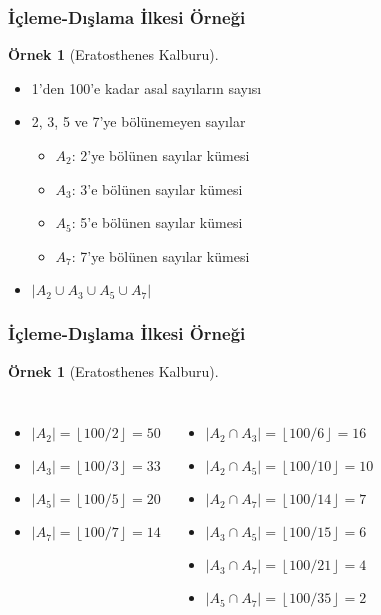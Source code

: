 \documentclass[dvipsnames]{beamer}
\theoremstyle{definition}
\theoremstyle{example}
\newtheorem{ornek}[theorem]{Örnek}
\theoremstyle{plain}
\begin{document}
\begin{frame}
  \frametitle{İçleme-Dışlama İlkesi Örneği}

  \begin{ornek}[Eratosthenes Kalburu]
    \begin{itemize}
      \item 1'den 100'e kadar asal sayıların sayısı
      \medskip

      \pause
      \item 2, 3, 5 ve 7'ye bölünemeyen sayılar
      \begin{itemize}
        \item $A_2$: 2'ye bölünen sayılar kümesi
        \item $A_3$: 3'e bölünen sayılar kümesi
        \item $A_5$: 5'e bölünen sayılar kümesi
        \item $A_7$: 7'ye bölünen sayılar kümesi
      \end{itemize}

      \pause
      \item $|A_2 \cup A_3 \cup A_5 \cup A_7|$
    \end{itemize}
  \end{ornek}
\end{frame}

\begin{frame}
  \frametitle{İçleme-Dışlama İlkesi Örneği}

  \begin{ornek}[Eratosthenes Kalburu]
    \begin{columns}[t]
      \begin{itemize}
        \item $|A_2| = \left\lfloor 100/2 \right\rfloor = 50$
        \item $|A_3| = \left\lfloor 100/3 \right\rfloor = 33$
        \item $|A_5| = \left\lfloor 100/5 \right\rfloor = 20$
        \item $|A_7| = \left\lfloor 100/7 \right\rfloor = 14$
      \end{itemize}

      \pause
      \begin{itemize}
        \item $|A_2 \cap A_3| = \left\lfloor 100/6  \right\rfloor = 16$
        \item $|A_2 \cap A_5| = \left\lfloor 100/10 \right\rfloor = 10$
        \item $|A_2 \cap A_7| = \left\lfloor 100/14 \right\rfloor = 7$
        \item $|A_3 \cap A_5| = \left\lfloor 100/15 \right\rfloor = 6$
        \item $|A_3 \cap A_7| = \left\lfloor 100/21 \right\rfloor = 4$
        \item $|A_5 \cap A_7| = \left\lfloor 100/35 \right\rfloor = 2$
      \end{itemize}
    \end{columns}
  \end{ornek}
\end{frame}
\end{document}

